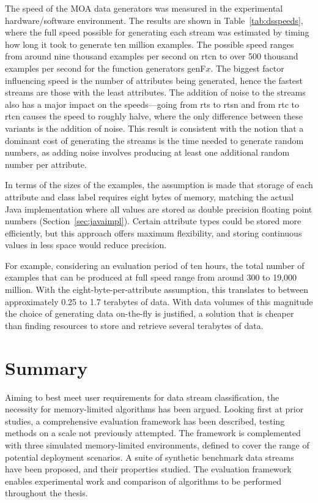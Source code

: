 The speed of the MOA data generators was measured in the experimental hardware/software environment. The results are shown in Table~\ref{tab:dsspeeds}, where the full speed possible for generating each stream was estimated by timing how long it took to generate ten million examples. The possible speed ranges from around nine thousand examples per second on {\sc rtcn} to over 500 thousand examples per second for the function generators {\sc genF$x$}. The biggest factor influencing speed is the number of attributes being generated, hence the fastest streams are those with the least attributes. The addition of noise to the streams also has a major impact on the speeds---going from {\sc rts} to {\sc rtsn} and from {\sc rtc} to {\sc rtcn} causes the speed to roughly halve, where the only difference between these variants is the addition of noise. 
This result is consistent with the notion that a dominant cost of generating the streams is the time needed to generate random numbers, as adding noise involves producing at least one additional random number per attribute.

In terms of the sizes of the examples, the assumption is made that storage of each attribute and class label requires eight bytes of memory, matching the actual Java implementation where all values are stored as double precision floating point numbers (Section~\ref{sec:javaimpl}). Certain attribute types could be stored more efficiently, but this approach offers maximum flexibility, and storing continuous values in less space would reduce precision.

For example, considering an evaluation period of ten hours, the total number of examples that can be produced at full speed range from around 300 to 19,000 million. With the eight-byte-per-attribute assumption, this translates to between approximately 0.25 to 1.7 terabytes of data. With data volumes of this magnitude the choice of generating data on-the-fly is justified, a solution that is cheaper than finding resources to store and retrieve several terabytes of data.

\BEGINOMIT
\section{Summary}

Aiming to best meet user requirements for data stream classification, the necessity for memory-limited algorithms has been argued. Looking first at prior studies, a comprehensive evaluation framework has been described, testing methods on a scale not previously attempted. The framework is complemented with three simulated memory-limited environments, defined to cover the range of potential deployment scenarios.  A suite of synthetic benchmark data streams have been proposed, and their properties studied. The evaluation framework enables experimental work and comparison of algorithms to be performed throughout the thesis.
\ENDOMIT
